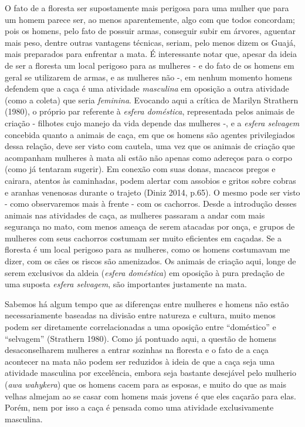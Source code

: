 O fato de a floresta ser supostamente mais perigosa para uma mulher que
para um homem parece ser, ao menos aparentemente, algo com que todos
concordam; pois os homens, pelo fato de possuir armas, conseguir subir
em árvores, aguentar mais peso, dentre outras vantagens técnicas,
seriam, pelo menos dizem os Guajá, mais preparados para enfrentar a
mata. É interessante notar que, apesar da ideia de ser a floresta um
local perigoso para as mulheres - e do fato de os homens em geral se
utilizarem de armas, e as mulheres não -, em nenhum momento homens
defendem que a caça é uma atividade \emph{masculina} em oposição a outra
atividade (como a coleta) que seria \emph{feminina}. Evocando aqui a
crítica de Marilyn Strathern (1980), o próprio par referente à
\emph{esfera doméstica}, representada pelos animais de criação -
filhotes cujo manejo da vida depende das mulheres -, e a \emph{esfera
selvagem} concebida quanto a animais de caça, em que os homens são
agentes privilegiados dessa relação, deve ser visto com cautela, uma vez
que os animais de criação que acompanham mulheres à mata ali estão não
apenas como adereços para o corpo (como já tentaram sugerir). Em conexão
com suas donas, macacos pregos e cairara, atentos às caminhadas, podem
alertar com assobios e gritos sobre cobras e aranhas venenosas durante o
trajeto (Diniz 2014, p.65). O mesmo pode ser visto - como observaremos
mais à frente - com os cachorros. Desde a introdução desses animais nas
atividades de caça, as mulheres passaram a andar com mais segurança no
mato, com menos ameaça de serem atacadas por onça, e grupos de mulheres
com seus cachorros costumam ser muito eficientes em caçadas. Se a
floresta é um local perigoso para as mulheres, como os homens costumavam
me dizer, com os cães os riscos são amenizados. Os animais de criação
aqui, longe de serem exclusivos da aldeia (\emph{esfera doméstica}) em
oposição à pura predação de uma suposta \emph{esfera selvagem}, são
importantes justamente na mata.

Sabemos há algum tempo que as diferenças entre mulheres e homens não
estão necessariamente baseadas na divisão entre natureza e cultura,
muito menos podem ser diretamente correlacionadas a uma oposição entre
``doméstico'' e ``selvagem'' (Strathern 1980). Como já pontuado aqui, a
questão de homens desaconselharem mulheres a entrar sozinhas na floresta
e o fato de a caça acontecer na mata não podem ser reduzidos à ideia de
que a caça seja uma atividade masculina por excelência, embora seja
bastante desejável pelo mulherio (\emph{awa wahykera}) que os homens
cacem para as esposas, e muito do que as mais velhas almejam ao se casar
com homens mais jovens é que eles caçarão para elas. Porém, nem por isso
a caça é pensada como uma atividade exclusivamente masculina.


